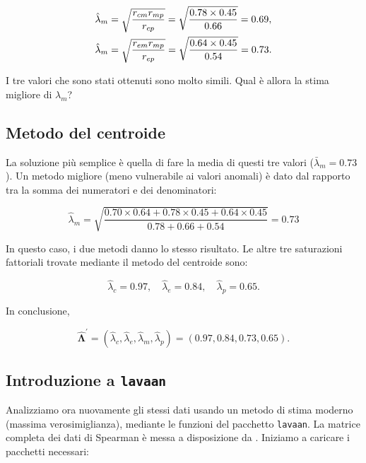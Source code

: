 \documentclass[
  11pt,
]{krantz}
\theoremstyle{definition}
\theoremstyle{definition}
\theoremstyle{definition}
\theoremstyle{definition}
\theoremstyle{remark}
\begin{document}
\begin{equation}
\begin{aligned}
  \hat{\lambda}_m &= \sqrt{ \frac{r_{cm} r_{mp}}{r_{cp}} } = \sqrt{ \frac{0.78 \times 0.45}{0.66} } = 0.69, \notag \\
  \hat{\lambda}_m &= \sqrt{ \frac{r_{em} r_{mp}}{r_{ep}} } = \sqrt{
    \frac{0.64 \times 0.45}{0.54} } = 0.73. \notag\end{aligned}
\end{equation}

I tre valori che sono stati ottenuti sono molto simili. Qual è allora la stima migliore di \(\lambda_m\)?

\hypertarget{metodo-del-centroide}{%
\subsection{Metodo del centroide}\label{metodo-del-centroide}}

La soluzione più semplice è quella di fare la media di questi tre valori (\(\bar{\lambda}_m = 0.73\)). Un metodo migliore (meno vulnerabile ai valori anomali) è dato dal rapporto tra la somma dei numeratori e dei denominatori:

\[
  \hat{\lambda}_m = \sqrt{ \frac{0.70 \times 0.64 + 0.78 \times 0.45 + 0.64
      \times 0.45}{0.78+0.66+0.54} } = 0.73
\]

In questo caso, i due metodi danno lo stesso risultato. Le altre tre saturazioni fattoriali trovate mediante il metodo del centroide sono:

\[
\hat{\lambda}_c = 0.97, \quad \hat{\lambda}_e = 0.84, \quad
\hat{\lambda}_p = 0.65.
\]

In conclusione,

\[
\boldsymbol{\hat{\Lambda}}^\prime=
(\hat{\lambda}_c, \hat{\lambda}_e, \hat{\lambda}_m, \hat{\lambda}_p) = (0.97, 0.84, 0.73, 0.65).
\]

\hypertarget{introduzione-a-lavaan}{%
\subsection{\texorpdfstring{Introduzione a \texttt{lavaan}}{Introduzione a lavaan}}\label{introduzione-a-lavaan}}

Analizziamo ora nuovamente gli stessi dati usando un metodo di stima moderno (massima verosimiglianza), mediante le funzioni del pacchetto \texttt{lavaan}. La matrice completa dei dati di Spearman è messa a disposizione da \citet{kan2019extending}. Iniziamo a caricare i pacchetti necessari:
\end{document}
